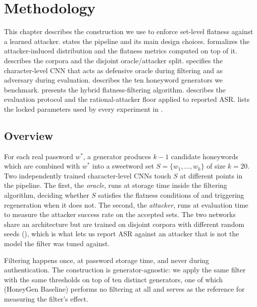 \chapter{Methodology}
\label{ch:method}

This chapter describes the construction we use to enforce set-level
flatness against a learned attacker.  states
the pipeline and its main design choices. 
formalizes the attacker-induced distribution and the flatness metrics
computed on top of it.  describes the corpora
and the disjoint oracle/attacker split.  specifies
the character-level CNN that acts as defensive oracle during filtering
and as adversary during evaluation.  describes the
ten honeyword generators we benchmark.  presents
the hybrid flatness-filtering algorithm. 
describes the evaluation protocol and the rational-attacker floor
applied to reported ASR.  lists the locked
parameters used by every experiment in .

\section{Overview}
\label{sec:method-overview}

For each real password $w^{*}$, a generator produces $k-1$ candidate
honeywords which are combined with $w^{*}$ into a sweetword set
$S = \{w_1, \ldots, w_k\}$ of size $k = 20$. Two independently trained
character-level CNNs touch $S$ at different points in the pipeline. The
first, the \emph{oracle}, runs at storage time inside the filtering
algorithm, deciding whether $S$ satisfies the flatness conditions of
 and triggering regeneration when it does
not. The second, the \emph{attacker}, runs at evaluation time to measure
the attacker success rate on the accepted sets. The two networks share
an architecture but are trained on disjoint corpora with different
random seeds (), which is what lets us report ASR
against an attacker that is not the model the filter was tuned against.

Filtering happens once, at password storage time, and never during
authentication. The construction is generator-agnostic: we apply the
same filter with the same thresholds on top of ten distinct generators,
one of which (HoneyGen Baseline) performs no filtering at all and serves
as the reference for measuring the filter's effect.

